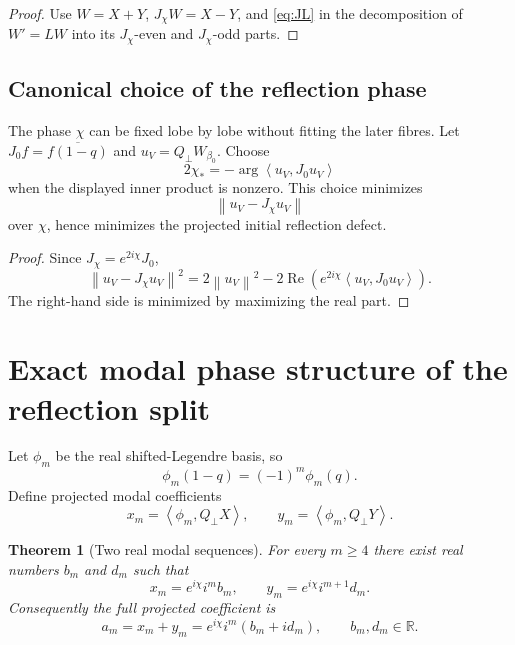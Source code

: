 \documentclass[11pt]{amsart}
\numberwithin{equation}{section}
\theoremstyle{plain}
\newtheorem{theorem}{Theorem}[section]
\theoremstyle{definition}
\theoremstyle{remark}
\newcommand{\R}{\mathbb R}
\newcommand{\Ree}{\operatorname{Re}}
\newcommand{\ip}[2]{\left\langle #1,#2\right\rangle}
\newcommand{\norm}[1]{\left\lVert #1\right\rVert}
\begin{document}
\begin{proof}
Use $W=X+Y$, $J_\chi W=X-Y$, and \eqref{eq:JL} in the decomposition of $W'=LW$ into its $J_\chi$-even and $J_\chi$-odd parts.
\end{proof}

\subsection{Canonical choice of the reflection phase}

The phase $\chi$ can be fixed lobe by lobe without fitting the later fibres.  Let $J_0f=\overline{f(1-q)}$ and $u_V=Q_\perp W_{\beta_0}$.  Choose
\begin{equation}
\boxed{
2\chi_*=-\arg\ip{u_V}{J_0u_V}
}
\label{eq:chi-star}
\end{equation}
when the displayed inner product is nonzero.  This choice minimizes
\begin{equation}
\norm{u_V-J_\chi u_V}
\end{equation}
over $\chi$, hence minimizes the projected initial reflection defect.

\begin{proof}
Since $J_\chi=e^{2i\chi}J_0$,
\begin{equation}
\norm{u_V-J_\chi u_V}^2
=2\norm{u_V}^2-2\Ree\left(e^{2i\chi}\ip{u_V}{J_0u_V}\right).
\end{equation}
The right-hand side is minimized by maximizing the real part.
\end{proof}

\section{Exact modal phase structure of the reflection split}
\label{sec:reflection-modal}

Let $\phi_m$ be the real shifted-Legendre basis, so
\begin{equation}
\phi_m(1-q)=(-1)^m\phi_m(q).
\end{equation}
Define projected modal coefficients
\begin{equation}
x_m=\ip{\phi_m}{Q_\perp X},
\qquad
y_m=\ip{\phi_m}{Q_\perp Y}.
\end{equation}

\begin{theorem}[Two real modal sequences]
\label{thm:two-real}
For every $m\ge4$ there exist real numbers $b_m$ and $d_m$ such that
\begin{equation}
\boxed{
x_m=e^{i\chi}i^m b_m,
\qquad
y_m=e^{i\chi}i^{m+1}d_m.
}
\label{eq:xy-modal}
\end{equation}
Consequently the full projected coefficient is
\begin{equation}
\boxed{
a_m=x_m+y_m=e^{i\chi}i^m(b_m+i d_m),
\qquad b_m,d_m\in\R.
}
\label{eq:a-bd}
\end{equation}
\end{theorem}
\end{document}
